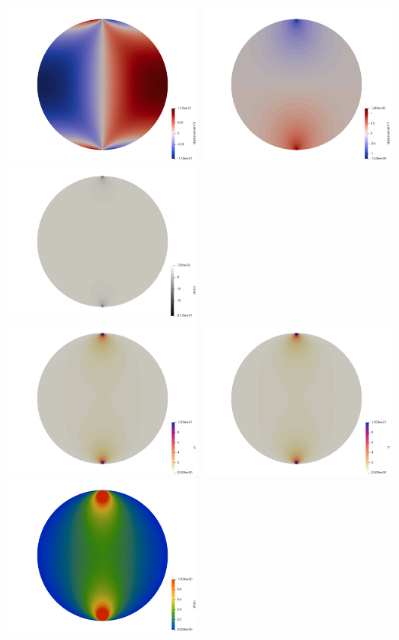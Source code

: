 \newpage
\begin{center}
\includegraphics[width=5cm]{python_codes/fieldstone_58/experiment1/111/u}
\includegraphics[width=5cm]{python_codes/fieldstone_58/experiment1/111/v}
\includegraphics[width=5cm]{python_codes/fieldstone_58/experiment1/111/divv}\\
\includegraphics[width=5cm]{python_codes/fieldstone_58/experiment1/111/p}
\includegraphics[width=5cm]{python_codes/fieldstone_58/experiment1/111/q}
\includegraphics[width=5cm]{python_codes/fieldstone_58/experiment1/111/e}\\

\end{center}
